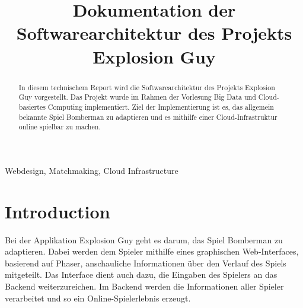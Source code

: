 \documentclass[conference]{IEEEtran}
\begin{document}
\title{Dokumentation der Softwarearchitektur des Projekts Explosion Guy}


\author{
	\and

	\and

	\and

	\and

}

\maketitle

\begin{abstract}
In diesem technischem Report wird die Softwarearchitektur des Projekts 
Explosion Guy vorgestellt. Das Projekt wurde im Rahmen der Vorlesung Big Data und Cloud-basiertes Computing implementiert. Ziel der Implementierung ist es, 
das allgemein bekannte Spiel \glqq Bomberman \grqq{} zu adaptieren und es mithilfe einer Cloud-Infrastruktur online spielbar zu machen.\\
\end{abstract}

\begin{IEEEkeywords}
 Webdesign, Matchmaking, Cloud Infrastructure
\end{IEEEkeywords}

\section{Introduction}
Bei der Applikation Explosion Guy geht es darum, das Spiel \glqq Bomberman\grqq{} zu adaptieren. Dabei werden dem Spieler mithilfe eines graphischen Web-Interfaces, basierend auf Phaser, anschauliche Informationen über den Verlauf des Spiels mitgeteilt. Das Interface dient auch dazu, die Eingaben des Spielers an das Backend weiterzureichen. Im Backend werden die Informationen aller Spieler verarbeitet und so ein Online-Spielerlebnis erzeugt.
\end{document}

